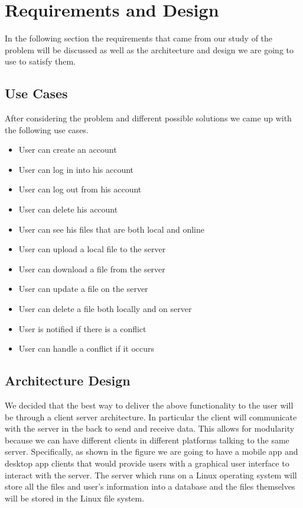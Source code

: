 \documentclass[11pt]{article}
\begin{document}

\section{Requirements and Design}

In the following section the requirements that came from our study of the problem will be discussed as well as the architecture and design we are going to use to satisfy them.

\subsection{Use Cases}

After considering the problem and different possible solutions we came up with the following use cases.

\begin{itemize}
	\item{User can create an account}
	\item{User can log in into his account}
	\item{User can log out from his account}
	\item{User can delete his account}
	\item{User can see his files that are both local and online}
	\item{User can upload a local file to the server}
	\item{User can download a file from the server}
	\item{User can update a file on the server}
	\item{User can delete a file both locally and on server}
	\item{User is notified if there is a conflict}
	\item{User can handle a conflict if it occurs}
\end{itemize}

\subsection{Architecture Design}

We decided that the best way to deliver the above functionality to the user will be through a client server architecture. In particular the client will communicate with the server in the back to send and receive data. This allows for modularity because we can have different clients in different platforms talking to the same server. Specifically, as shown in the figure we are going to have a mobile app and desktop app clients that would provide users with a graphical user interface to interact with the server. The server which runs on a Linux operating system will store all the files and user's information into a database and the files themselves will be stored in the Linux file system.
\end{document}
